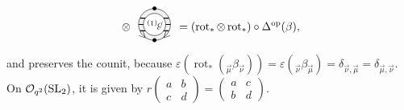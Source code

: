 \documentclass[pdftex]{sigma}%
\numberwithin{equation}{section}
\newcommand{\Oq}{\mathcal{O}_{q^2}({\rm SL}_2)}
\begin{document}
\begin{Definition}
\[\begin{tikzpicture}[scale = 1, baseline = -5pt]
\end{tikzpicture} \otimes \begin{tikzpicture}[scale = 1, baseline = -5pt]
\fill [gray!10] (0,0) circle (0.5);
\draw (0,0) circle (0.5);
\node[rotate = 135] at (-135:0.5) {\small $<$};
\node[rotate = -135] at (-45:0.5) {\small $>$};
\node at (0,-0.5){\small $\bullet$};
\node at (0,0.5){\small $\bullet$};
\draw [thick] (-0.5,0) -- (0.5,0);
\draw [thick] (-0.45,-0.2) -- (0.45,-0.2) ;
\draw [thick] (-0.45,0.2) -- (0.45,0.2);
\node[circle, rotate = 180, fill = white, draw = black, inner sep = 1pt] at (0,0) {\footnotesize $\beta_{(1)}$};
\end{tikzpicture} = (\operatorname{rot}_*\otimes \operatorname{rot}_*) \circ \Delta^{\rm op} (\beta),
\]
and preserves the counit, because $\varepsilon(\operatorname{rot}_*(_{\vec{\mu}}\beta_{\vec{\nu}})) = \varepsilon(_{\vec{\nu}}\beta_{\vec{\mu}}) = \delta_{\vec{\nu},\vec{\mu}} = \delta_{\vec{\mu},\vec{\nu}}$.
On $\Oq$, it is given by $r\left(\begin{smallmatrix}a&b\\c&d\end{smallmatrix}\right) = \left( \begin{smallmatrix}a&c\\b&d\end{smallmatrix}\right)$.
\end{Definition}
\end{document}
